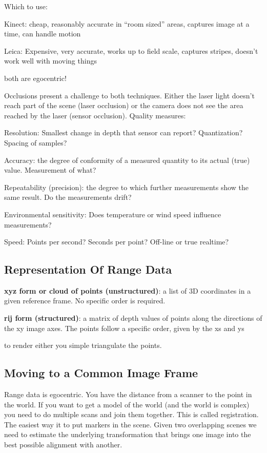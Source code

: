 \documentclass[8pt]{extarticle}
\begin{document}
\begin{multicols}{2}
Which to use:
\begin{compactitem}
    \item Kinect: cheap, reasonably accurate in “room sized” areas, captures image at a time, can handle motion
    \item Leica: Expensive, very accurate, works up to field scale, captures stripes, doesn’t work well with moving things
    \item both are egocentric!
\end{compactitem}

Occlusions present a challenge to both techniques. Either the laser light doesn't reach part of the scene (laser occlusion) or the camera does not see the area reached by the laser (sensor occlusion). Quality measures:

\begin{compactitem}
    \item Resolution: Smallest change in depth that sensor can report? Quantization? Spacing of samples?
    \item Accuracy: the degree of conformity of a measured quantity to its actual (true) value. Measurement of what?
    \item Repeatability (precision): the degree to which further measurements show the same result. Do the measurements drift?
    \item Environmental sensitivity: Does temperature or wind speed influence measurements?
    \item Speed: Points per second? Seconds per point? Off-line or true realtime?
\end{compactitem}

\subsection{Representation Of Range Data}
\textbf{xyz form or cloud of points (unstructured)}:  a list of 3D coordinates in a given reference frame. No specific order is required.

\textbf{rij form (structured)}: a matrix of depth values of points along the directions of the xy image axes. The points follow a specific order, given by the xs and ys

to render either you simple triangulate the points.

\subsection{Moving to a Common Image Frame}
Range data is egocentric. You have the distance from a scanner to the point in the world. If you want to get a model of the world (and the world is complex) you need to do multiple scans and join them together. This is called registration. The easiest way it to put markers in the scene. Given two overlapping scenes we need to estimate the underlying transformation that brings one image into the best possible alignment with another.


\end{multicols}
\end{document}
